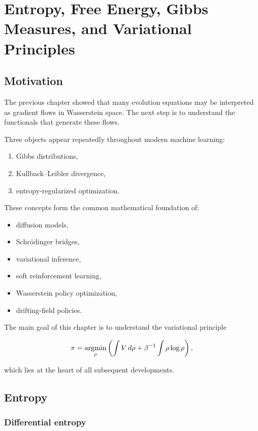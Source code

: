 
\chapter{Entropy, Free Energy, Gibbs Measures, and Variational Principles}

\section{Motivation}

The previous chapter showed that many evolution equations may be interpreted as
gradient flows in Wasserstein space. The next step is to understand the
functionals that generate these flows.

Three objects appear repeatedly throughout modern machine learning:

\begin{enumerate}
    \item Gibbs distributions,
    \item Kullback--Leibler divergence,
    \item entropy-regularized optimization.
\end{enumerate}

These concepts form the common mathematical foundation of:

\begin{itemize}
    \item diffusion models,
    \item Schrödinger bridges,
    \item variational inference,
    \item soft reinforcement learning,
    \item Wasserstein policy optimization,
    \item drifting-field policies.
\end{itemize}

The main goal of this chapter is to understand the variational principle

\[
\pi
=
\operatorname*{argmin}_\rho
\left(
\int V\,d\rho
+
\beta^{-1}
\int \rho\log\rho
\right),
\]

which lies at the heart of all subsequent developments.

\section{Entropy}

\subsection{Differential entropy}

